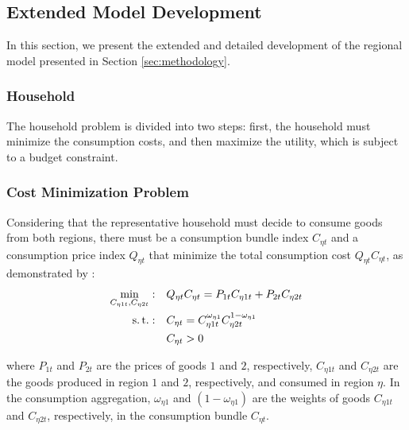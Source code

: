 \documentclass[../thesis.tex]{subfiles}
\begin{document}
\newpage

\subsection{Extended Model Development}

In this section, we present the extended and detailed development of the regional model presented in Section \eqref{sec:methodology}.


\subsubsection{Household}


The household problem is divided into two steps: first, the household must minimize the consumption costs, and then maximize the utility, which is subject to a budget constraint.

\subsubsection*{Cost Minimization Problem}

Considering that the representative household must decide to consume goods from both regions, there must be a consumption bundle index $C_{\eta t}$ and a consumption price index $Q_{\eta t}$ that minimize the total consumption cost $Q_{\eta t} C_{\eta t}$, as demonstrated by \textcite[p.424]{walsh_monetary_2017}:
	\begin{align}
		\min_{C_{\eta 1 t}, C_{\eta 2 t}}: &\quad Q_{\eta t} C_{\eta t} = P_{1 t} C_{\eta 1t} + P_{2 t} C_{\eta 2t} \label{ext-mod:reg-consumption-cost}
		\\
		\operatorname{s.t.}: &\quad C_{\eta t} = C_{\eta 1 t}^{\omega_{\eta 1}} C_{\eta 2 t}^{1-\omega_{\eta 1}} \label{ext-mod:reg-consumption-aggregation} \\
		&\quad C_{\eta t} > 0 \nonumber
	\end{align}

	where $P_{1t}$ and $P_{2t}$ are the prices of goods $1$ and $2$, respectively, $C_{\eta 1 t}$ and $C_{\eta 2 t}$ are the goods produced in region $1$ and $2$, respectively, and consumed in region $\eta$. In the consumption aggregation, ${\omega_{\eta 1}}$ and $({1 - \omega_{\eta 1}})$ are the weights of goods $C_{\eta 1 t}$ and $C_{\eta 2 t}$, respectively, in the consumption bundle $C_{\eta t}$.
\end{document}
